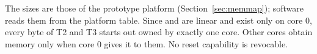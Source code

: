 The sizes are those of the prototype platform (Section~\ref{sec:memmap}); software reads them from
the platform table. Since  and  are linear and exist only on core 0, every byte of T2 and
T3 starts out owned by exactly one core. Other cores obtain memory only when core 0 gives it to them. No reset
capability is revocable.
